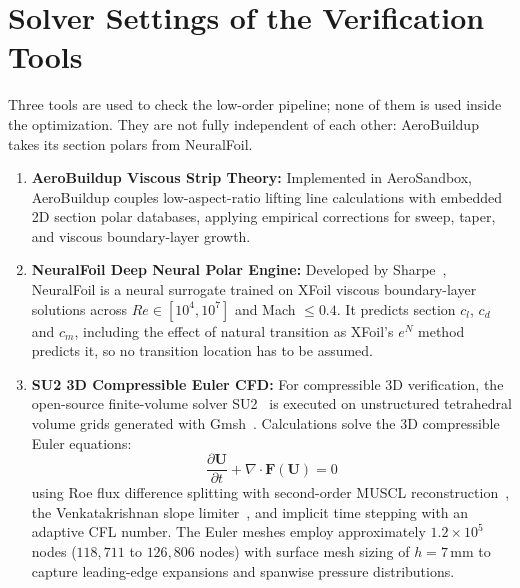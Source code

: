 \section{Solver Settings of the Verification Tools}
\label{sec:mf_architecture}
Three tools are used to check the low-order pipeline; none of them is used inside the optimization. They are not fully independent of each other: AeroBuildup takes its section polars from NeuralFoil.
\begin{enumerate}
    \item \textbf{AeroBuildup Viscous Strip Theory:} Implemented in AeroSandbox, AeroBuildup couples low-aspect-ratio lifting line calculations with embedded 2D section polar databases, applying empirical corrections for sweep, taper, and viscous boundary-layer growth.
    \item \textbf{NeuralFoil Deep Neural Polar Engine:} Developed by Sharpe~\cite{sharpe2024neuralfoil}, NeuralFoil is a neural surrogate trained on XFoil viscous boundary-layer solutions across $Re \in [10^4, 10^7]$ and Mach $\le 0.4$. It predicts section $c_l$, $c_d$ and $c_m$, including the effect of natural transition as XFoil's $e^N$ method predicts it, so no transition location has to be assumed.
    \item \textbf{SU2 3D Compressible Euler CFD:} For compressible 3D verification, the open-source finite-volume solver SU2~\cite{economon2016su2} is executed on unstructured tetrahedral volume grids generated with Gmsh~\cite{geuzaine2009gmsh}. Calculations solve the 3D compressible Euler equations:
    \begin{equation}
    \frac{\partial \mathbf{U}}{\partial t} + \nabla \cdot \mathbf{F}(\mathbf{U}) = 0
    \end{equation}
    using Roe flux difference splitting with second-order MUSCL reconstruction~\cite{roe1981approximate}, the Venkatakrishnan slope limiter~\cite{venkatakrishnan1993limiter}, and implicit time stepping with an adaptive CFL number. The Euler meshes employ approximately $1.2 \times 10^5$ nodes ($118{,}711$ to $126{,}806$ nodes) with surface mesh sizing of $h = 7\,\mathrm{mm}$ to capture leading-edge expansions and spanwise pressure distributions.
\end{enumerate}



